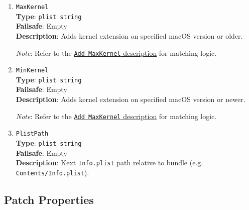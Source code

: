 \documentclass[]{article}
\begin{document}
\begin{enumerate}
\item
  \texttt{MaxKernel}\\
  \textbf{Type}: \texttt{plist\ string}\\
  \textbf{Failsafe}: Empty\\
  \textbf{Description}: Adds kernel extension on specified macOS version or older.

  \emph{Note}: Refer to the \hyperlink{kernmatch}{\texttt{Add\ MaxKernel} description} for matching logic.

\item
  \texttt{MinKernel}\\
  \textbf{Type}: \texttt{plist\ string}\\
  \textbf{Failsafe}: Empty\\
  \textbf{Description}: Adds kernel extension on specified macOS version or newer.

  \emph{Note}: Refer to the \hyperlink{kernmatch}{\texttt{Add\ MaxKernel} description} for matching logic.

\item
  \texttt{PlistPath}\\
  \textbf{Type}: \texttt{plist\ string}\\
  \textbf{Failsafe}: Empty\\
  \textbf{Description}: Kext \texttt{Info.plist} path relative to bundle
  (e.g. \texttt{Contents/Info.plist}).

\end{enumerate}


\subsection{Patch Properties}\label{kernelpropspatch}
\end{document}
